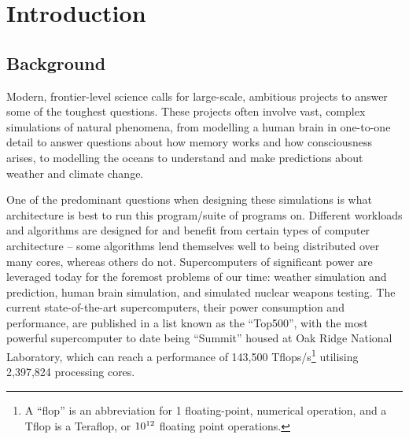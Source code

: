 \documentclass[conference]{IEEEtran}
\begin{document}
\section{Introduction}
\label{sec:introduction}

\subsection{Background}

Modern, frontier-level science calls for large-scale, ambitious projects to answer some of the toughest questions. These projects often involve vast, complex simulations of natural phenomena, from modelling a human brain in one-to-one detail to answer questions about how memory works and how consciousness arises, to modelling the oceans to understand and make predictions about weather and climate change.

One of the predominant questions when designing these simulations is what architecture is best to run this program/suite of programs on. Different workloads and algorithms are designed for and benefit from certain types of computer architecture – some algorithms lend themselves well to being distributed over many cores, whereas others do not. Supercomputers of significant power are leveraged today for the foremost problems of our time: weather simulation and prediction\cite{metoffice}, human brain simulation\cite{humanbrain}, and simulated nuclear weapons testing\cite{nuclear}. The current state-of-the-art supercomputers, their power consumption and performance, are published in a list known as the ``Top500”\cite{top500}, with the most powerful supercomputer to date being ``Summit” housed at Oak Ridge National Laboratory, which can reach a performance of 143,500 Tflops/s\footnote{A ``flop” is an abbreviation for 1 floating-point, numerical operation, and a Tflop is a Teraflop, or $10\textsuperscript{12}$ floating point operations.} utilising 2,397,824 processing cores.
\end{document}
